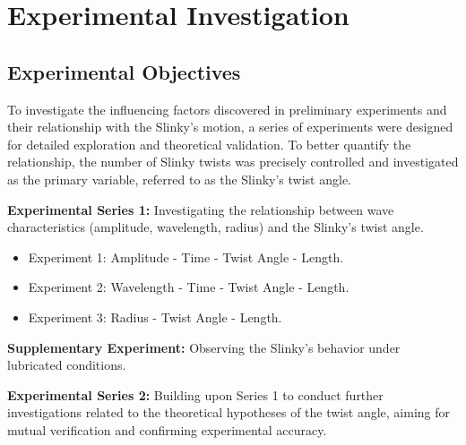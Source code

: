\documentclass{mcmthesis}  %
\begin{document}
\section{Experimental Investigation}

\subsection{Experimental Objectives}
To investigate the influencing factors discovered in preliminary experiments and their relationship with the Slinky's motion, a series of experiments were designed for detailed exploration and theoretical validation. To better quantify the relationship, the number of Slinky twists was precisely controlled and investigated as the primary variable, referred to as the Slinky's twist angle.

\textbf{Experimental Series 1:} Investigating the relationship between wave characteristics (amplitude, wavelength, radius) and the Slinky's twist angle.
\begin{itemize}
    \item Experiment 1: Amplitude - Time - Twist Angle - Length.
    \item Experiment 2: Wavelength - Time - Twist Angle - Length.
    \item Experiment 3: Radius - Twist Angle - Length.
\end{itemize}

\textbf{Supplementary Experiment:} Observing the Slinky's behavior under lubricated conditions.

\textbf{Experimental Series 2:} Building upon Series 1 to conduct further investigations related to the theoretical hypotheses of the twist angle, aiming for mutual verification and confirming experimental accuracy.
\end{document}
